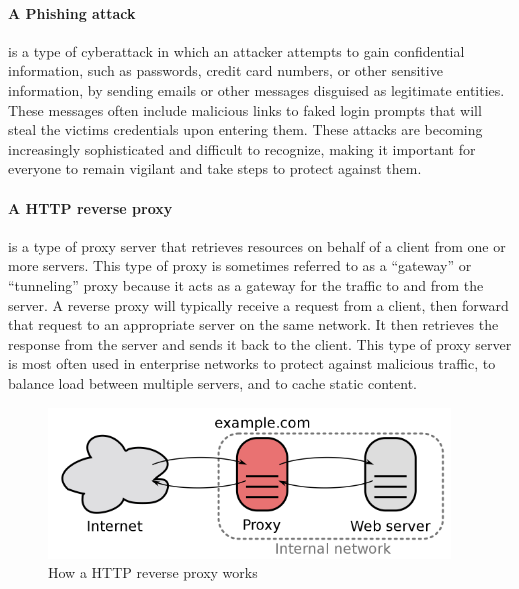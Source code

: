 \documentclass[12pt]{scrbook}
\begin{document}
\paragraph{A Phishing attack} is a type of cyberattack in which an attacker
attempts to gain
confidential information, such as passwords, credit card numbers, or other
sensitive information, by sending emails or other messages disguised as
legitimate entities. These messages often include malicious links to faked login
prompts that will steal the victims credentials upon entering them. These
attacks are becoming increasingly sophisticated and difficult to recognize,
making it important for everyone to remain vigilant and take steps to protect
against them.

\paragraph{A HTTP reverse proxy} is a type of proxy server that
retrieves resources on behalf of a client from one or more servers. This type of
proxy is sometimes referred to as a “gateway” or “tunneling” proxy because it
acts as a gateway for the traffic to and from the server. A reverse proxy will
typically receive a request from a client, then forward that request to an
appropriate server on the same network. It then retrieves the response from the
server and sends it back to the client. This type of proxy server is most often
used in enterprise networks to protect against malicious traffic, to balance
load between multiple servers, and to cache static content.
\begin{figure}[!h]
	\centering
	\includegraphics[height=4cm]{./images/http_reverse_proxy.png}
	\caption{How a HTTP reverse proxy works}
\end{figure}
\end{document}
